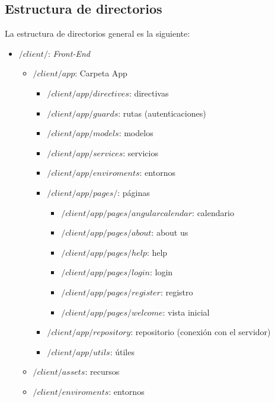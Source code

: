 \subsection{Estructura de directorios }

La estructura de directorios general es la siguiente:


\begin{itemize}
	\item \textbf{$/client/$}: \emph{Front-End} 
	\begin{itemize}
	\item \textbf{$/client/app$}: Carpeta App
		\begin{itemize}
		\item \textbf{$/client/app/ directives$}: directivas
		\item \textbf{$/client/app/ guards$}: rutas (autenticaciones)
		\item \textbf{$/client/app/ models$}: modelos
		\item \textbf{$/client/app/ services$}:  servicios
		\item \textbf{$/client/app/ enviroments$}:  entornos
		\item \textbf{$/client/app/ pages/$}:  páginas
			\begin{itemize}
			\item \textbf{$/client/app/pages/angular calendar $}:  calendario
			\item \textbf{$/client/app/pages/about $}:   about us
			\item \textbf{$/client/app/pages/help $}:   help
			\item \textbf{$/client/app/pages/login $}:  login
			\item \textbf{$/client/app/pages/register $}:   registro
			\item \textbf{$/client/app/pages/welcome $}:   vista inicial
			\end{itemize}
		\item \textbf{$/client/app/repository $}:  repositorio (conexión con el servidor)
		\item \textbf{$/client/app/utils $}:   útiles
		\end{itemize}
	\item \textbf{$/client/assets $}: recursos  
	\item \textbf{$/client/enviroments $}:  entornos
   \end{itemize}

\end{itemize}
